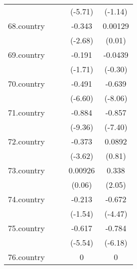 {\begin{tabular}{l*{4}{c}}
            &                     &                     &     (-5.71)         &     (-1.14)         \\
[1em]
68.country  &                     &                     &      -0.343\sym{**} &     0.00129         \\
            &                     &                     &     (-2.68)         &      (0.01)         \\
[1em]
69.country  &                     &                     &      -0.191         &     -0.0439         \\
            &                     &                     &     (-1.71)         &     (-0.30)         \\
[1em]
70.country  &                     &                     &      -0.491\sym{***}&      -0.639\sym{***}\\
            &                     &                     &     (-6.60)         &     (-8.06)         \\
[1em]
71.country  &                     &                     &      -0.884\sym{***}&      -0.857\sym{***}\\
            &                     &                     &     (-9.36)         &     (-7.40)         \\
[1em]
72.country  &                     &                     &      -0.373\sym{***}&      0.0892         \\
            &                     &                     &     (-3.62)         &      (0.81)         \\
[1em]
73.country  &                     &                     &     0.00926         &       0.338\sym{*}  \\
            &                     &                     &      (0.06)         &      (2.05)         \\
[1em]
74.country  &                     &                     &      -0.213         &      -0.672\sym{***}\\
            &                     &                     &     (-1.54)         &     (-4.47)         \\
[1em]
75.country  &                     &                     &      -0.617\sym{***}&      -0.784\sym{***}\\
            &                     &                     &     (-5.54)         &     (-6.18)         \\
[1em]
76.country  &                     &                     &           0         &           0         \\

\end{tabular}}
